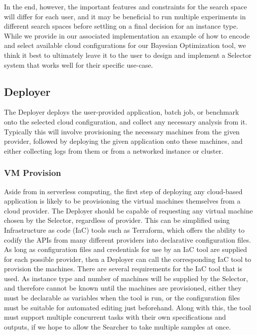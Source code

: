 \documentclass{article}
\begin{document}
In the end,  however, the important features and constraints for the search space will differ for each user, and it may be beneficial to run multiple experiments in different search spaces before settling on a final decision for an instance type. While we provide in our associated implementation an example of how to encode and select available cloud configurations for our Bayesian Optimization tool, we think it best to ultimately leave it to the user to design and implement a Selector system that works well for their specific use-case.


\subsection{Deployer}
The Deployer deploys the user-provided application, batch job, or benchmark onto the selected cloud configuration, and collect any necessary analysis from it. Typically this will involve provisioning the necessary machines from the given provider, followed by deploying the given application onto these machines, and either collecting logs from them or from a networked instance or cluster. 

\subsubsection{VM Provision}
Aside from in serverless computing, the first step of deploying any cloud-based application is likely to be provisioning the virtual machines themselves from a cloud provider. The Deployer should be capable of requesting any virtual machine chosen by the Selector, regardless of provider. This can be simplified using Infrastructure as code (IaC) tools such as Terraform, which offers the ability to codify the APIs from many different providers into declarative configuration files. As long as configuration files and credentials for use by an IaC tool are supplied for each possible provider, then a Deployer can call the corresponding IaC tool to provision the machines. 
There are several requirements for the IaC tool that is used. As instance type and number of machines will be supplied by the Selector, and therefore cannot be known until the machines are provisioned, either they must be declarable as variables when the tool is run, or the configuration files must be suitable for automated editing just beforehand. Along with this, the tool must support multiple concurrent tasks with their own specifications and outputs, if we hope to allow the Searcher to take multiple samples at once.
\end{document}
